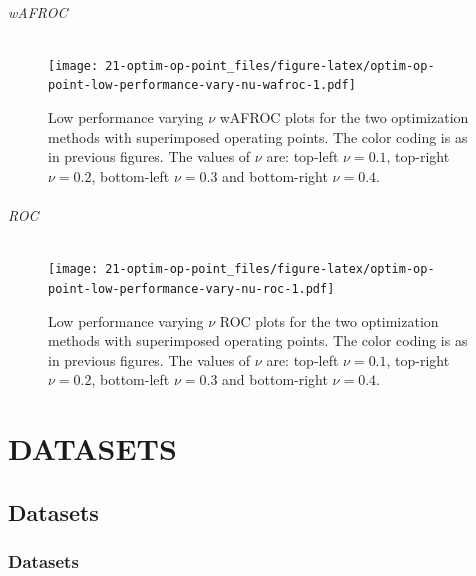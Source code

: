 \documentclass[
]{book}
\begin{document}
\hypertarget{wafroc-10}{%
\paragraph{wAFROC}\label{wafroc-10}}

\begin{figure}
\centering
\texttt{[image: 21-optim-op-point\_files/figure-latex/optim-op-point-low-performance-vary-nu-wafroc-1.pdf]}
\caption{\label{fig:optim-op-point-low-performance-vary-nu-wafroc}Low performance varying \(\nu\) wAFROC plots for the two optimization methods with superimposed operating points. The color coding is as in previous figures. The values of \(\nu\) are: top-left \(\nu = 0.1\), top-right \(\nu = 0.2\), bottom-left \(\nu = 0.3\) and bottom-right \(\nu = 0.4\).}
\end{figure}

\hypertarget{roc-10}{%
\paragraph{ROC}\label{roc-10}}

\begin{figure}
\centering
\texttt{[image: 21-optim-op-point\_files/figure-latex/optim-op-point-low-performance-vary-nu-roc-1.pdf]}
\caption{\label{fig:optim-op-point-low-performance-vary-nu-roc}Low performance varying \(\nu\) ROC plots for the two optimization methods with superimposed operating points. The color coding is as in previous figures. The values of \(\nu\) are: top-left \(\nu = 0.1\), top-right \(\nu = 0.2\), bottom-left \(\nu = 0.3\) and bottom-right \(\nu = 0.4\).}
\end{figure}

\hypertarget{part-datasets}{%
\part*{DATASETS}\label{part-datasets}}

\hypertarget{datasets}{%
\chapter{Datasets}\label{datasets}}

\hypertarget{datasets-datasets}{%
\section{Datasets}\label{datasets-datasets}}
\end{document}
